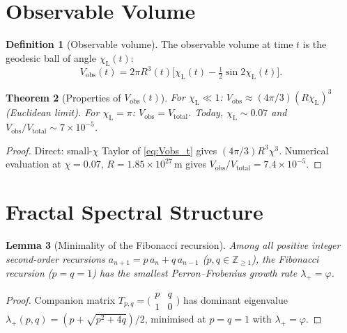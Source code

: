 \documentclass[12pt,a4paper]{amsart}
\theoremstyle{plain}
\newtheorem{theorem}{Theorem}[section]
\newtheorem{lemma}[theorem]{Lemma}
\theoremstyle{definition}
\newtheorem{definition}[theorem]{Definition}
\theoremstyle{remark}
\newcommand{\vp}{\varphi}
\newcommand{\half}{\tfrac{1}{2}}
\newcommand{\Vtot}{V_{\mathrm{total}}}
\newcommand{\Vobs}{V_{\mathrm{obs}}}
\newcommand{\chiL}{\chi_{\mathrm{L}}}
\begin{document}
\section{Observable Volume}
\label{sec:obsvol}

\begin{definition}[Observable volume]
  \label{def:Vobs_t}
  The observable volume at time $t$ is the geodesic ball of angle
  $\chiL(t)$:
  \begin{equation}
    \Vobs(t) = 2\pi R^3(t)\bigl[\chiL(t) - \half\sin 2\chiL(t)\bigr].
    \label{eq:Vobs_t}
  \end{equation}
\end{definition}

\begin{theorem}[Properties of $\Vobs(t)$]
  \label{thm:Vobsprop}
  For $\chiL\ll 1$: $\Vobs\approx (4\pi/3)(R\chiL)^3$ (Euclidean limit).
  For $\chiL=\pi$: $\Vobs=\Vtot$.
  Today, $\chiL\sim 0.07$ and $\Vobs/\Vtot\sim 7\times 10^{-5}$.
\end{theorem}

\begin{proof}
  Direct: small-$\chi$ Taylor of \eqref{eq:Vobs_t} gives $(4\pi/3)R^3\chi^3$.
  Numerical evaluation at $\chi=0.07$, $R=1.85\times 10^{27}\,\mathrm{m}$
  gives $\Vobs/\Vtot=7.4\times 10^{-5}$.
\end{proof}

\section{Fractal Spectral Structure}
\label{sec:phi}

\begin{lemma}[Minimality of the Fibonacci recursion]
  \label{lem:minimal}
  Among all positive integer second-order recursions
  $a_{n+1}=p\,a_n+q\,a_{n-1}$ ($p,q\in\mathbb{Z}_{\geq 1}$), the
  Fibonacci recursion ($p=q=1$) has the smallest Perron--Frobenius
  growth rate $\lambda_+=\vp$.
\end{lemma}

\begin{proof}
  Companion matrix
  $T_{p,q}=\bigl(\begin{smallmatrix}p&q\\1&0\end{smallmatrix}\bigr)$
  has dominant eigenvalue $\lambda_+(p,q)=(p+\sqrt{p^2+4q})/2$,
  minimised at $p=q=1$ with $\lambda_+=\vp$.
\end{proof}
\end{document}
